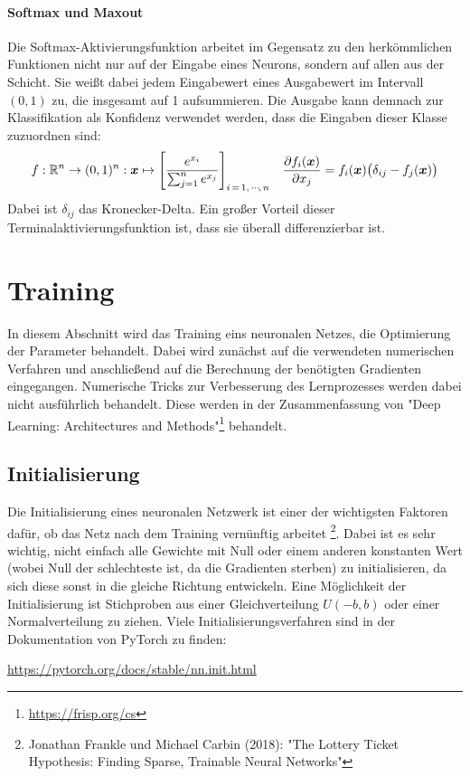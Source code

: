 		\paragraph{Softmax und Maxout}
			Die Softmax-Aktivierungsfunktion arbeitet im Gegensatz zu den herkömmlichen Funktionen nicht nur auf der Eingabe eines Neurons, sondern auf allen aus der Schicht. Sie weißt dabei jedem Eingabewert eines Ausgabewert im Intervall \( (0, 1) \) zu, die insgesamt auf \num{1} aufsummieren. Die Ausgabe kann demnach zur Klassifikation als Konfidenz verwendet werden, dass die Eingaben dieser Klasse zuzuordnen sind:
			\begin{align}
				f : \mathbb{R}^n \to (0, 1)^n : \bm{x} \mapsto
					\Bigg[ \frac{e^{x_i}}{\sum_{j = 1}^{n} e^{x_j}} \Bigg]_{i \,=\, 1,\,\cdots\!,\,n} &&
				\pdv{f_i(\bm{x})}{x_j} = f_i(\bm{x}) \big( \delta_{ij} - f_j(\bm{x}) \big)
			\end{align}
			Dabei ist \(\delta_{ij}\) das Kronecker-Delta. Ein großer Vorteil dieser Terminalaktivierungsfunktion ist, dass sie überall differenzierbar ist.

	\section{Training}
		In diesem Abschnitt wird das Training eins neuronalen Netzes, \dh die Optimierung der Parameter behandelt. Dabei wird zunächst auf die verwendeten numerischen Verfahren und anschließend auf die Berechnung der benötigten Gradienten eingegangen. Numerische Tricks zur Verbesserung des Lernprozesses werden dabei nicht ausführlich behandelt. Diese werden in der Zusammenfassung von "Deep Learning: Architectures and Methods"\footnote{\url{https://frisp.org/cs}} behandelt.

		\subsection{Initialisierung}
			Die Initialisierung eines neuronalen Netzwerk ist einer der wichtigsten Faktoren dafür, ob das Netz nach dem Training vernünftig arbeitet \footnote{Jonathan Frankle und Michael Carbin (2018): "The Lottery Ticket Hypothesis: Finding Sparse, Trainable Neural Networks"}. Dabei ist es sehr wichtig, nicht einfach alle Gewichte mit Null oder einem anderen konstanten Wert (wobei Null der schlechteste ist, da die Gradienten sterben) zu initialisieren, da sich diese sonst in die gleiche Richtung entwickeln. Eine Möglichkeit der Initialisierung ist Stichproben aus einer Gleichverteilung \( U(-b, b) \) oder einer Normalverteilung zu ziehen. Viele Initialisierungsverfahren sind \zB in der Dokumentation von PyTorch zu finden:
			\begin{center}
				\url{https://pytorch.org/docs/stable/nn.init.html}
			\end{center}


